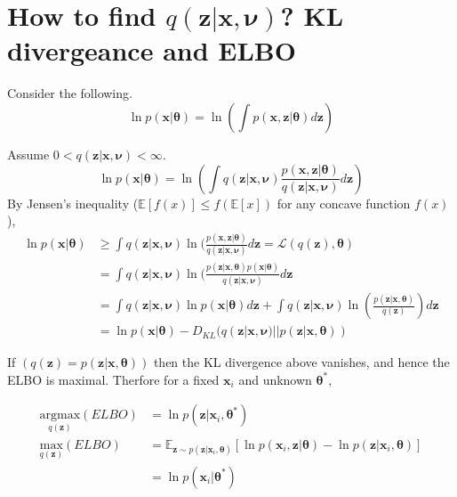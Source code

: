 \documentclass[a4]{article}
\begin{document}
\section{How to find $q(\mathbf{z}|\mathbf{x}, \bm{\nu})$? KL divergeance and ELBO}

Consider the following.
\[
\ln p(\mathbf{x}|\bm{\theta}) = \ln (\int p(\mathbf{x},\mathbf{z}|\bm{\theta})d\mathbf{z})
\]

Assume $0 < q(\mathbf{z}|\mathbf{x}, \bm{\nu}) < \infty$.
\[
\ln p(\mathbf{x}|\bm{\theta}) = \ln (\int q(\mathbf{z}|\mathbf{x}, \bm{\nu}) \frac{p(\mathbf{x},\mathbf{z}|\bm{\theta})}{q(\mathbf{z}|\mathbf{x}, \bm{\nu})} d\mathbf{z})
\]
By Jensen's inequality ($\mathbb{E}[f(x)] \le f(\mathbb{E}[x])$ for any concave function $f(x)$),
\begin{equation}
\begin{aligned}
\ln p(\mathbf{x}|\bm{\theta}) &\ge \int q(\mathbf{z}|\mathbf{x}, \bm{\nu}) \ln ( \frac{p(\mathbf{x},\mathbf{z}|\bm{\theta})}{q(\mathbf{z}|\mathbf{x}, \bm{\nu})} d\mathbf{z} = \mathcal{L}(q(\mathbf{z}), \bm{\theta})\label{eq1}\\
&= \int q(\mathbf{z}|\mathbf{x}, \bm{\nu}) \ln ( \frac{p(\mathbf{z}|\mathbf{x},\bm{\theta})p(\mathbf{x}|\bm{\theta})}{q(\mathbf{z}|\mathbf{x}, \bm{\nu})} d\mathbf{z}\\
&= \int q(\mathbf{z}|\mathbf{x}, \bm{\nu}) \ln p(\mathbf{x}|\bm{\theta})d\mathbf{z} +
\int q(\mathbf{z}|\mathbf{x}, \bm{\nu}) \ln ( \frac{p(\mathbf{z}|\mathbf{x},\bm{\theta})}{q(\mathbf{z})}) d\mathbf{z}\\
&= \ln p(\mathbf{x}|\bm{\theta}) - D_{KL}(q(\mathbf{z}|\mathbf{x}, \bm{\nu}) || p(\mathbf{z}|\mathbf{x},\bm{\theta}))
\end{aligned}
\end{equation}

If $( q(\mathbf{z}) = p(\mathbf{z}|\mathbf{x},\bm{\theta}))$ then the KL divergence above
vanishes, and hence the ELBO is maximal. Therfore for a fixed $\mathbf{x}_i$ and unknown $\bm{\theta^*}$,

\begin{equation}
\begin{aligned}
\underset{q(\mathbf{z})}{\mathrm{argmax}}(ELBO) &= \ln p(\mathbf{z}|\mathbf{x}_i,\bm{\theta^*})\\
\underset{q(\mathbf{z})}{\mathrm{max}}(ELBO) &= \mathbb{E}_{\mathbf{z}\sim p(\mathbf{z}|\mathbf{x}_i,\bm{\theta}) }[ \ln p(\mathbf{x}_i,\mathbf{z}|\bm{\theta}) - \ln p(\mathbf{z}|\mathbf{x}_i,\bm{\theta}) ]\\
&= \ln p(\mathbf{x}_i|\bm{\theta^*}) 
\end{aligned}
\end{equation}
\end{document}
